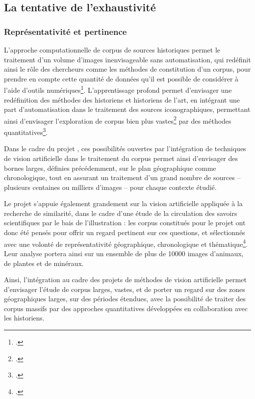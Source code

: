 
\subsection{La tentative de l’exhaustivité}
    \subsubsection{Représentativité et pertinence}
L'approche computationnelle de corpus de sources historiques permet le traitement d'un volume d'images inenvisageable sans automatisation, qui redéfinit ainsi le rôle des chercheurs comme les méthodes de constitution d'un corpus, pour prendre en compte cette quantité de données qu'il est possible de considérer à l'aide d'outils numériques\footcite{klinkeBigImageData2016}. L'apprentissage profond permet d'envisager une redéfinition des méthodes des historiens et historiens de l'art, en intégrant une part d'automatisation dans le traitement des sources iconographiques, permettant ainsi d'envisager l'exploration de corpus bien plus vastes\footcite{moiraghiExplorerCorpusImages2018} par des méthodes quantitatives\footcite{klinkeBigImageData2016}.

Dans le cadre du projet \eida, ces possibilités ouvertes par l'intégration de techniques de vision artificielle dans le traitement du corpus permet ainsi d'envisager des bornes larges, définies précédemment, sur le plan géographique comme chronologique, tout en assurant un traitement d'un grand nombre de sources -- plusieurs centaines ou milliers d'images -- pour chaque contexte étudié. 

Le projet \vhs s'appuie également grandement sur la vision artificielle appliquée à la recherche de similarité, dans le cadre d'une étude de la circulation des savoirs scientifiques par le bais de l'illustration : les corpus constitués pour le projet ont donc été pensés pour offrir un regard pertinent sur ces questions, et sélectionnés avec une volonté de représentativité géographique, chronologique et thématique\footcite{Corpus}. Leur analyse portera ainsi sur un ensemble de plus de 10000 images d'animaux, de plantes et de minéraux.

Ainsi, l'intégration au cadre des projets de méthodes de vision artificielle permet d'envisager l'étude de corpus larges, vastes, et de porter un regard sur des zones géographiques larges, sur des périodes étendues, avec la possibilité de traiter des corpus massifs par des approches quantitatives développées en collaboration avec les historiens.

